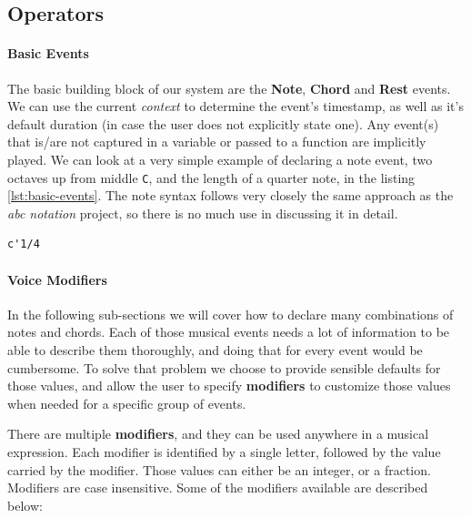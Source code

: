 \documentclass[a4paper,UKenglish,cleveref, autoref]{oasics-v2019}
\begin{document}
\subsection{Operators}

\paragraph*{Basic Events}
The basic building block of our system are the \textbf{Note}, \textbf{Chord} and \textbf{Rest} events. We can use the current \textit{context} to determine the event's timestamp, as well as it's default duration (in case the user does not explicitly state one). Any event(s) that is/are not captured in a variable or passed to a function are implicitly played. We can look at a very simple example of declaring a note event, two octaves up from middle \texttt{C}, and the length of a quarter note, in the listing \ref{lst:basic-events}. The note syntax follows very closely the same approach as the \textit{abc notation} project, so there is no much use in discussing it in detail.

\begin{lstlisting}[caption={Creating a Note Event},label=lst:basic-events,captionpos=t,abovecaptionskip=-\medskipamount]
c'1/4
\end{lstlisting}

\paragraph*{Voice Modifiers}
In the following sub-sections we will cover how to declare many combinations of notes and chords. Each of those musical events needs a lot of information to be able to describe them thoroughly, and doing that for every event would be cumbersome. To solve that problem we choose to provide sensible defaults for those values, and allow the user to specify \textbf{modifiers} to customize those values when needed for a specific group of events.

There are multiple \textbf{modifiers}, and they can be used anywhere in a musical expression. Each modifier is identified by a single letter, followed by the value carried by the modifier. Those values can either be an integer, or a fraction. Modifiers are case insensitive. Some of the modifiers available are described below:
\end{document}
